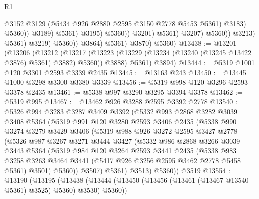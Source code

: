 \begin{lexlean}{R1}
\begin{coremodule}
                                                @3152
                                                @3129
                                                (@5434 @926 @2880 @2595 @3150 @2778 @5453 @5361)
                                                @3183)
                                              @5360))
                                          @3189)
                                        @5361)
                                      @3195)
                                    @5360))
                                @3201)
                              @5361)
                            @3207)
                          @5360))
                      @3213)
                    @5361)
                  @3219)
                @5360))
            @3864)
          @5361)
        @3870)
      @5360)
@13438 := @13201
    (@13206
      (@13212
        (@13217 (@13223 (@13229 (@13234 (@13240 (@13245 @13422 @3876) @5361) @3882) @5360)) @3888)
        @5361)
      @3894)
@13444 := @5319 @1001 @120 @3301 @2593 @3339 @2435
@13445 := @13163 @243
@13450 := @13445 @1000 @3298 @3300 @3380 @3339
@13456 := @5319 @998 @120 @3296 @2593 @3378 @2435
@13461 := @5338 @997 @3290 @3295 @3394 @3378
@13462 := @5319 @995
@13467 := @13462 @926 @3288 @2595 @3392 @2778
@13540 := @5326
    @994
    @3283
    @3287
    @3409
    @3392
    (@5332
      @993
      @2868
      @3282
      @3039
      @3408
      @5364
      (@5319
        @991
        @120
        @3280
        @2593
        @3406
        @2435
        (@5338
          @990
          @3274
          @3279
          @3429
          @3406
          (@5319
            @988
            @926
            @3272
            @2595
            @3427
            @2778
            (@5326
              @987
              @3267
              @3271
              @3444
              @3427
              (@5332
                @986
                @2868
                @3266
                @3039
                @3443
                @5364
                (@5319
                  @984
                  @120
                  @3264
                  @2593
                  @3441
                  @2435
                  (@5338
                    @983
                    @3258
                    @3263
                    @3464
                    @3441
                    (@5417 @926 @3256 @2595 @3462 @2778 @5458 @5361)
                    @3501)
                  @5360))
              @3507)
            @5361)
          @3513)
        @5360))
    @3519
@13554 := @13190
    (@13195
      (@13438 (@13444 (@13450 (@13456 (@13461 (@13467 @13540 @5361) @3525) @5360) @3530) @5360))

\end{coremodule}
\end{lexlean}
